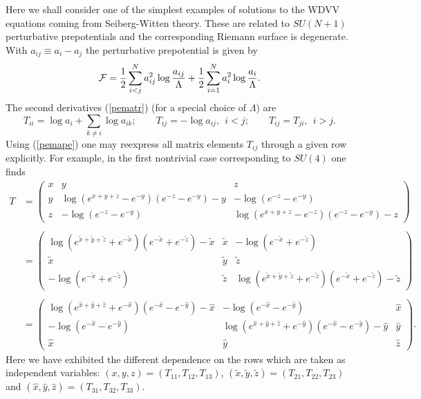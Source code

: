 \documentclass[a4paper,]{article}
\def\2{{1\over 2}}
\def\F{{\cal F}}
\begin{document}
Here we shall consider one of the simplest examples of solutions to the WDVV 
equations coming from Seiberg-Witten theory. These are related
to $SU(N+1)$ perturbative prepotentials \cite{MMM} and the corresponding
Riemann surface is degenerate. With $a_{ij}\equiv a_i-a_j$ the
perturbative prepotential is given by
\begin{equation}
\label{pertpre}
\F = \2\sum_{i<j}^N a_{ij}^2\log {a_{ij}\over\Lambda} +
\2\sum_{i=1}^N a_i^2\log {a_i\over\Lambda}.
\end{equation}
The second derivatives (\ref{pematr}) (for a special choice of
$\Lambda$) are
\begin{equation}
\label{pemape}
T_{ii} = \log a_i + \sum_{k\neq i}\log a_{ik};
\qquad
T_{ij} = - \log a_{ij}, \ \ i<j;
\qquad
T_{ij} = T_{ji},\ \ i>j.
\end{equation}
Using (\ref{pemape}) one may reexpress all matrix elements $T_{ij}$ through
a given row explicitly.
For example, in the first nontrivial case corresponding to $SU(4)$ one finds
\begin{equation}
\label{pemasu4}
\begin{split}
T &= \left(
\begin{array}{ccc}
  x & y & z \\
  y & \log\left(e^{x+y+z}-e^{-y}\right)\left(e^{-z}-e^{-y}\right)-y &
-\log\left(e^{-z}-e^{-y}\right) \\
  z & -\log\left(e^{-z}-e^{-y}\right) &
\log\left(e^{x+y+z}-e^{-z}\right)\left(e^{-z}-e^{-y}\right)-z
\end{array}\right)
\\
\\
&= \left(
\begin{array}{ccc}
 \log\left(e^{\tilde{x}+\tilde{y}+\tilde{z}}+e^{-\tilde x}\right)
\left(e^{-\tilde x}+e^{-\tilde z}\right)- \tilde{x}
& \tilde{x} & -\log\left(e^{-\tilde x}+e^{-\tilde z}\right) \\
  \tilde{x} & \tilde{y} & \tilde{z} \\
-\log\left(e^{-\tilde x}+e^{-\tilde z}\right)  & \tilde{z} &
\log\left(e^{\tilde{x}+\tilde{y}+\tilde{z}}+e^{-\tilde z}\right)
\left(e^{-\tilde x}+e^{-\tilde z}\right)- \tilde{z}
\end{array}\right)
\\
\\
&= \left(
\begin{array}{ccc}
 \log\left(e^{\hat{x}+\hat{y}+\hat{z}}+e^{-\hat x}\right)
\left(e^{-\hat x}-e^{-\hat y}\right)- \hat{x}
& -\log\left(e^{-\hat x}-e^{-\hat y}\right) & \hat{x} \\
-\log\left(e^{-\hat x}-e^{-\hat y}\right)  &
\log\left(e^{\hat{x}+\hat{y}+\hat{z}}+e^{-\hat y}\right)
\left(e^{-\hat x}-e^{-\hat y}\right)- \hat{y} &
\hat{y} \\
\hat{x} & \hat{y} & \hat{z}
\end{array}\right).
\end{split}
\end{equation}
Here we have exhibited the different dependence on the rows
which are taken as independent variables:
$(x,y,z)=(T_{11},T_{12},T_{13})$,
$(\tilde{x},\tilde{y},\tilde{z})=(T_{21},T_{22},T_{23})$ and
$(\hat{x},\hat{y},\hat{z})=(T_{31},T_{32},T_{33})$.
\end{document}
